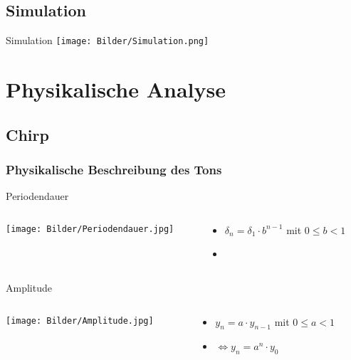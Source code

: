 \documentclass[12pt]{beamer}
\begin{document}
\subsection{Simulation}
\begin{frame}{Simulation}
\texttt{[image: Bilder/Simulation.png]}
\end{frame}
\section{Physikalische Analyse}
\subsection{Chirp}
\subsubsection{Physikalische Beschreibung des Tons}

\begin{frame}{Periodendauer}
\begin{columns}
\begin{column}{.67\textwidth}
	\texttt{[image: Bilder/Periodendauer.jpg]}
\end{column}
\begin{column}{.33\textwidth}
	\begin{itemize}
	\item<2-> $\delta_n=\delta_1\cdot b^{n-1}$ mit $0\leq b<1$
	\item[ ] \ %
	\end{itemize}
\end{column}
\end{columns}
\end{frame}

\begin{frame}{Amplitude}
\begin{columns}
\begin{column}{.67\textwidth}
	\texttt{[image: Bilder/Amplitude.jpg]}
\end{column}
\begin{column}{.33\textwidth}
	\begin{itemize}
	\item<2-> $y_n=a\cdot y_{n-1}$ mit $0\leq a<1$
	\item<3-> $\Leftrightarrow y_n=a^n\cdot y_0$
	\end{itemize}
\end{column}
\end{columns}
	
\end{frame}
\end{document}
